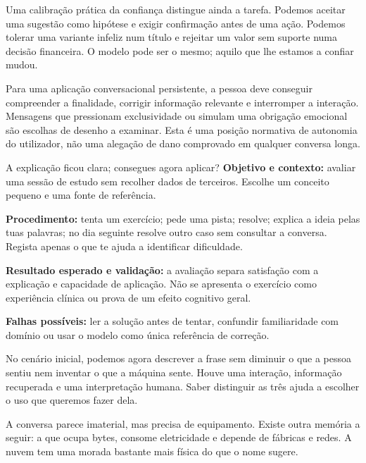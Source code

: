 Uma calibração prática da confiança distingue ainda a tarefa. Podemos aceitar uma sugestão como hipótese e exigir confirmação antes de uma ação. Podemos tolerar uma variante infeliz num título e rejeitar um valor sem suporte numa decisão financeira. O modelo pode ser o mesmo; aquilo que lhe estamos a confiar mudou.

Para uma aplicação conversacional persistente, a pessoa deve conseguir compreender a finalidade, corrigir informação relevante e interromper a interação. Mensagens que pressionam exclusividade ou simulam uma obrigação emocional são escolhas de desenho a examinar. Esta é uma posição normativa de autonomia do utilizador, não uma alegação de dano comprovado em qualquer conversa longa.

\begin{promptlabbox}{A explicação ficou clara; consegues agora aplicar?}
\textbf{Objetivo e contexto:} avaliar uma sessão de estudo sem recolher dados de terceiros. Escolhe um conceito pequeno e uma fonte de referência.

\textbf{Procedimento:} tenta um exercício; pede uma pista; resolve; explica a ideia pelas tuas palavras; no dia seguinte resolve outro caso sem consultar a conversa. Regista apenas o que te ajuda a identificar dificuldade.

\textbf{Resultado esperado e validação:} a avaliação separa satisfação com a explicação e capacidade de aplicação. Não se apresenta o exercício como experiência clínica ou prova de um efeito cognitivo geral.

\textbf{Falhas possíveis:} ler a solução antes de tentar, confundir familiaridade com domínio ou usar o modelo como única referência de correção.
\end{promptlabbox}

No cenário inicial, podemos agora descrever a frase sem diminuir o que a pessoa sentiu nem inventar o que a máquina sente. Houve uma interação, informação recuperada e uma interpretação humana. Saber distinguir as três ajuda a escolher o uso que queremos fazer dela.

A conversa parece imaterial, mas precisa de equipamento. Existe outra memória a seguir: a que ocupa bytes, consome eletricidade e depende de fábricas e redes. A nuvem tem uma morada bastante mais física do que o nome sugere.
